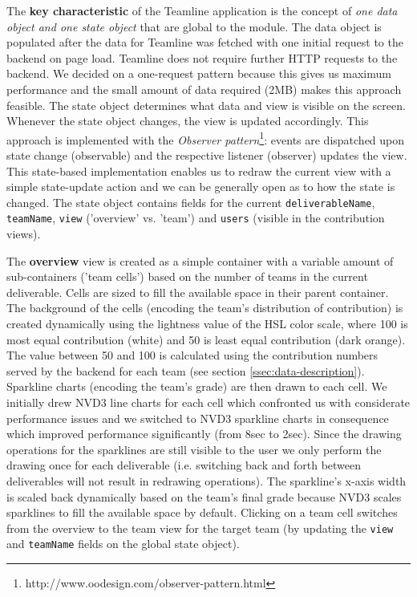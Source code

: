 \documentclass[../manifest.tex]{subfiles}
\begin{document}
The \textbf{key characteristic} of the Teamline application is the concept of \textit{one data object and one state object} that are global to the module. The data object is populated after the data for Teamline was fetched with one initial request to the backend on page load. Teamline does not require further HTTP requests to the backend. We decided on a one-request pattern because this gives us maximum performance and the small amount of data required (\texttildelow2MB) makes this approach feasible. The state object determines what data and view is visible on the screen. Whenever the state object changes, the view is updated accordingly. This approach is implemented with the \textit{Observer pattern}\footnote{http://www.oodesign.com/observer-pattern.html}: events are dispatched upon state change (observable) and the respective listener (observer) updates the view. This state-based implementation enables us to redraw the current view with a simple state-update action and we can be generally open as to how the state is changed. The state object contains fields for the current \texttt{deliverableName}, \texttt{teamName}, \texttt{view} ('overview' vs. 'team') and \texttt{users} (visible in the contribution views).

The \textbf{overview} view is created as a simple container with a variable amount of sub-containers ('team cells') based on the number of teams in the current deliverable. Cells are sized to fill the available space in their parent container. The background of the cells (encoding the team's distribution of contribution) is created dynamically using the lightness value of the HSL color scale, where 100 is most equal contribution (white) and 50 is least equal contribution (dark orange). The value between 50 and 100 is calculated using the contribution numbers served by the backend for each team (see section \ref{ssec:data-description}). Sparkline charts (encoding the team's grade) are then drawn to each cell. We initially drew NVD3 line charts for each cell which confronted us with considerate performance issues and we switched to NVD3 sparkline charts in consequence which improved performance significantly (from \texttildelow8sec to \texttildelow2sec). Since the drawing operations for the sparklines are still visible to the user we only perform the drawing once for each deliverable (i.e. switching back and forth between deliverables will not result in redrawing operations). The sparkline's x-axis width is scaled back dynamically based on the team's final grade because NVD3 scales sparklines to fill the available space by default. Clicking on a team cell switches from the overview to the team view for the target team (by updating the \texttt{view} and \texttt{teamName} fields on the global state object).
\end{document}
